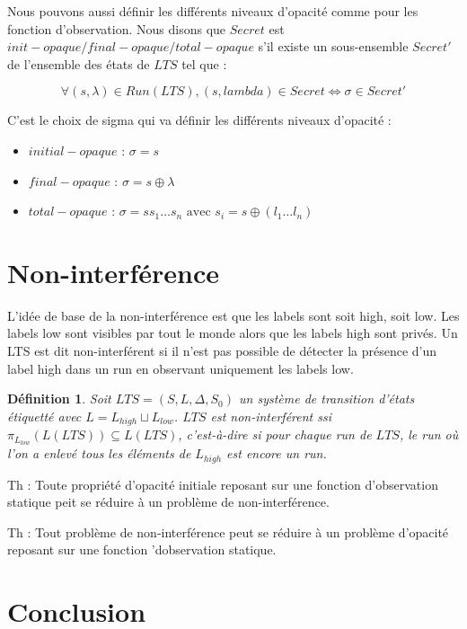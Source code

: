 \documentclass[10pt,a4paper]{article}
\newtheorem{mydef}{D\'efinition}
\begin{document}
Nous pouvons aussi d\'efinir les diff\'erents niveaux d'opacit\'e comme pour les fonction d'observation. Nous disons que $Secret$ est $init-opaque/final-opaque/total-opaque$ s'il existe un sous-ensemble  $Secret'$ de l'ensemble des \'etats de $LTS$ tel que :

$$\forall (s,\lambda) \in Run(LTS), (s,lambda) \in Secret \Leftrightarrow \sigma \in Secret'$$

C'est le choix de sigma qui va d\'efinir les diff\'erents niveaux d'opacit\'e :

\begin{itemize}
	\item $initial-opaque$ : $\sigma = s$
	\item $final-opaque$ : $\sigma = s\oplus \lambda$
	\item $total-opaque$ : $\sigma = s s_1 \dots s_n \mbox{ avec } s_i = s\oplus(l_1\dots l_n)$
\end{itemize} 

\section{Non-interf\'erence}

L'id\'ee de base de la non-interf\'erence est que les labels sont soit high, soit low. Les labels low sont visibles par tout le monde alors que les labels high sont priv\'es. Un LTS est dit non-interf\'erent si il n'est pas possible de d\'etecter la pr\'esence d'un label high dans un run en observant uniquement les labels low.~\cite{GorrieriV10}

\begin{mydef}
  Soit $LTS = (S,L,\Delta,S_0)$ un syst\`eme de transition d'\'etats \'etiquett\'e avec $L=L_{high}\sqcup L_{low}$. $LTS$ est non-interf\'erent ssi $\pi_{L_{low}}(L(LTS)) \subseteq L(LTS)$, c'est-\`a-dire si pour chaque run de $LTS$, le run o\`u l'on a enlev\'e tous les \'el\'ements de $L_{high}$ est encore un run.
\end{mydef}

Th : Toute propri\'et\'e d'opacit\'e initiale reposant sur une fonction d'observation statique peit se r\'eduire \`a un probl\`eme  de non-interf\'erence.

Th : Tout probl\`eme de non-interf\'erence peut se r\'eduire \`a un probl\`eme d'opacit\'e reposant sur une fonction 'dobservation statique.
\section{Conclusion}
\end{document}
